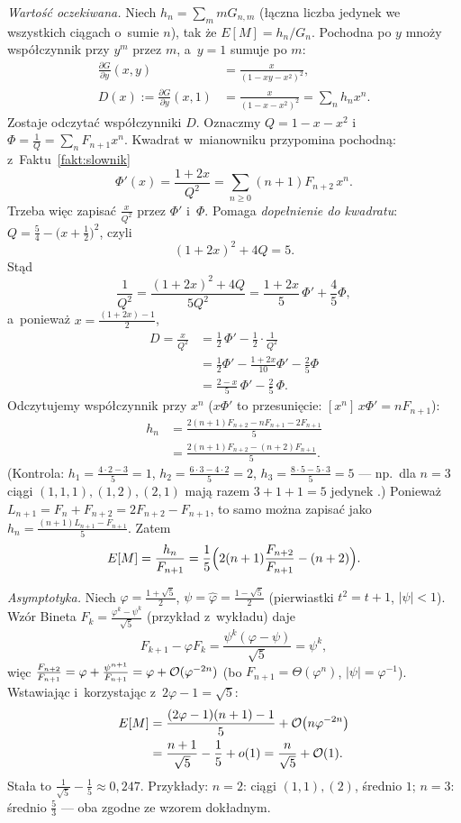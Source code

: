 \documentclass[11pt]{article}
\begin{document}
\emph{Wartość oczekiwana.} Niech $h_n=\sum_mmG_{n,m}$ (łączna liczba jedynek
we wszystkich ciągach o~sumie $n$), tak że $E[M]=h_n/G_n$. Pochodna po $y$
mnoży współczynnik przy $y^m$ przez $m$, a~$y=1$ sumuje po $m$:
\begin{align*}
\frac{\partial G}{\partial y}(x,y)&=\frac{x}{(1-xy-x^2)^2},\\
D(x):=\frac{\partial G}{\partial y}(x,1)&=\frac{x}{(1-x-x^2)^2}=\sum_nh_nx^n.
\end{align*}
Zostaje odczytać współczynniki $D$. Oznaczmy $Q=1-x-x^2$ i~$\Phi=\frac1Q=\sum_n
F_{n+1}x^n$. Kwadrat w~mianowniku przypomina pochodną: z~Faktu~\ref{fakt:slownik}
\[
\Phi'(x)=\frac{1+2x}{Q^2}=\sum_{n\ge0}(n+1)F_{n+2}\,x^n.
\]
Trzeba więc zapisać $\frac x{Q^2}$ przez $\Phi'$ i~$\Phi$. Pomaga
\emph{dopełnienie do kwadratu}: $Q=\frac54-\bigl(x+\frac12\bigr)^2$, czyli
\[
(1+2x)^2+4Q=5.
\]
Stąd
\[
\frac1{Q^2}=\frac{(1+2x)^2+4Q}{5Q^2}=\frac{1+2x}5\,\Phi'+\frac45\Phi,
\]
a~ponieważ $x=\frac{(1+2x)-1}2$,
\begin{align*}
D=\frac x{Q^2}&=\frac12\,\Phi'-\frac12\cdot\frac1{Q^2}\\
&=\frac12\Phi'-\frac{1+2x}{10}\Phi'-\frac25\Phi\\
&=\frac{2-x}5\,\Phi'-\frac25\,\Phi.
\end{align*}
Odczytujemy współczynnik przy $x^n$ ($x\Phi'$ to przesunięcie: $[x^n]\,x\Phi'=nF_{n+1}$):
\begin{align*}
h_n&=\frac{2(n+1)F_{n+2}-nF_{n+1}-2F_{n+1}}5\\
&=\frac{2(n+1)F_{n+2}-(n+2)F_{n+1}}5.
\end{align*}
(Kontrola: $h_1=\frac{4\cdot2-3}5=1$, $h_2=\frac{6\cdot3-4\cdot2}5=2$,
$h_3=\frac{8\cdot5-5\cdot3}5=5$ --- np.\ dla $n=3$ ciągi $(1,1,1),(1,2),(2,1)$
mają razem $3+1+1=5$ jedynek \checkmark.) Ponieważ $L_{n+1}=F_n+F_{n+2}=
2F_{n+2}-F_{n+1}$, to samo można zapisać jako
$h_n=\frac{(n+1)L_{n+1}-F_{n+1}}5$. Zatem
\[
E[M]=\frac{h_n}{F_{n+1}}=\frac15\Bigl(2(n+1)\frac{F_{n+2}}{F_{n+1}}-(n+2)\Bigr).
\]

\emph{Asymptotyka.} Niech $\varphi=\frac{1+\sqrt5}2$, $\psi=\hat\varphi=\frac{1-\sqrt5}2$
(pierwiastki $t^2=t+1$, $|\psi|<1$). Wzór Bineta $F_k=\frac{\varphi^k-\psi^k}{\sqrt5}$
(przykład z~wykładu) daje
\[
F_{k+1}-\varphi F_k=\frac{\psi^k(\varphi-\psi)}{\sqrt5}=\psi^k,
\]
więc $\frac{F_{n+2}}{F_{n+1}}=\varphi+\frac{\psi^{n+1}}{F_{n+1}}
=\varphi+\mathcal{O}(\varphi^{-2n})$ (bo $F_{n+1}=\Theta(\varphi^n)$, $|\psi|=\varphi^{-1}$).
Wstawiając i~korzystając z~$2\varphi-1=\sqrt5$:
\begin{align*}
E[M]&=\frac{(2\varphi-1)(n+1)-1}5+\mathcal{O}\bigl(n\varphi^{-2n}\bigr)\\
&=\frac{n+1}{\sqrt5}-\frac15+o(1)
=\frac n{\sqrt5}+\mathcal{O}(1).
\end{align*}
Stała to $\frac1{\sqrt5}-\frac15\approx0{,}247$. Przykłady: $n=2$: ciągi
$(1,1),(2)$, średnio $1$; $n=3$: średnio $\frac53$ --- oba zgodne ze wzorem
dokładnym.
\end{document}
